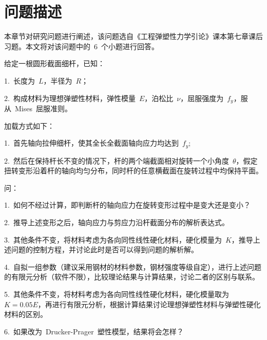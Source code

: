 \chapter{问题描述}
\label{cha:Description}
本章节对研究问题进行阐述，该问题选自《工程弹塑性力学引论》课本第七章课后习题\cite{gctsxyl}。本文将对该问题中的~6~个小题进行回答。

给定一根圆形截面细杆，已知： 

1.~长度为~{$L$}，半径为~{$R$}； 

2.~构成材料为理想弹塑性材料，弹性模量~{$E$}，泊松比~{$\nu$}，屈服强度为~{$f_y$}，服从~Mises~屈服准则。 

加载方式如下： 

1.~首先轴向拉伸细杆，使其全长全截面轴向应力均达到~{$f_y$}; 

2.~然后在保持杆长不变的情况下，杆的两个端截面相对旋转一个小角度~{$\theta$}，假定扭转变形沿着杆的轴向均匀分布，同时杆的任意横截面在旋转过程中均保持平面。 

问：
 
1.~如何不经过计算，即判断杆的轴向应力在旋转变形过程中是变大还是变小？ 

2.~推导上述变形之后，轴向应力与剪应力沿杆截面分布的解析表达式。

3.~其他条件不变，将材料考虑为各向同性线性硬化材料，硬化模量为~{$K$}，推导上述问题的控制方程，并讨论此时是否可以得到问题的解析解。

4.~自拟一组参数（建议采用钢材的材料参数，钢材强度等级自定），进行上述问题的有限元分析（软件不限），比较理论结果与计算结果，讨论二者的区别与联系。 

5.~其他条件不变，将材料考虑为各向同性线性硬化材料，硬化模量取为~{$K=0.05E$}，再进行有限元分析，根据计算结果讨论理想弹塑性材料与弹塑性硬化材料的区别。 

6.~如果改为~Drucker-Prager~塑性模型，结果将会怎样？